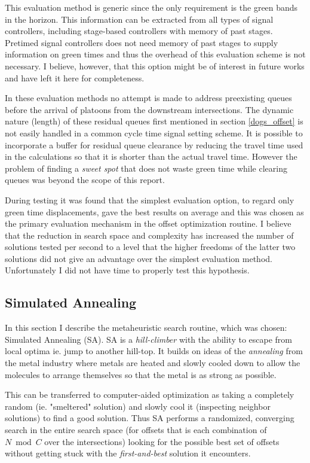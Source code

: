 \begin{description}
This evaluation method is generic since the only requirement is the green bands in the horizon. This information can be extracted from all types of signal controllers, including stage-based controllers with memory of past stages. Pretimed signal controllers does not need memory of past stages to supply information on green times and thus the overhead of this evaluation scheme is not necessary. I believe, however, that this option might be of interest in future works and have left it here for completeness.

\end{description}

In these evaluation methods no attempt is made to address preexisting queues before the arrival of platoons from the downstream intersections. The dynamic nature (length) of these residual queues first mentioned in section \ref{dogs_offset} is not easily handled in a common cycle time signal setting scheme. It is possible to incorporate a buffer for residual queue clearance by reducing the travel time used in the calculations so that it is shorter than the actual travel time. However the problem of finding a \textit{sweet spot} that does not waste green time while clearing queues was beyond the scope of this report.

During testing it was found that the simplest evaluation option, to regard only green time displacements, gave the best results on average and this was chosen as the primary evaluation mechanism in the offset optimization routine. I believe that the reduction in search space and complexity has increased the number of solutions tested per second to a level that the higher freedoms of the latter two solutions did not give an advantage over the simplest evaluation method. Unfortunately I did not have time to properly test this hypothesis.

\subsection{Simulated Annealing}
\label{siman}
In this section I describe the metaheuristic search routine, which was chosen: Simulated Annealing (SA). 
SA is a \textit{hill-climber} with the ability to escape from local optima ie. jump to another hill-top. It builds on ideas of the \textit{annealing} from the metal industry where metals are heated and slowly cooled down to allow the molecules to arrange themselves so that the metal is as strong as possible.

This can be transferred to computer-aided optimization as taking a completely random (ie. "smeltered" solution) and slowly cool it (inspecting neighbor solutions) to find a good solution. Thus SA performs a randomized, converging search in the entire search space (for offsets that is each combination of $N \bmod C$ over the intersections) looking for the possible best set of offsets without getting stuck with the \textit{first-and-best} solution it encounters.

